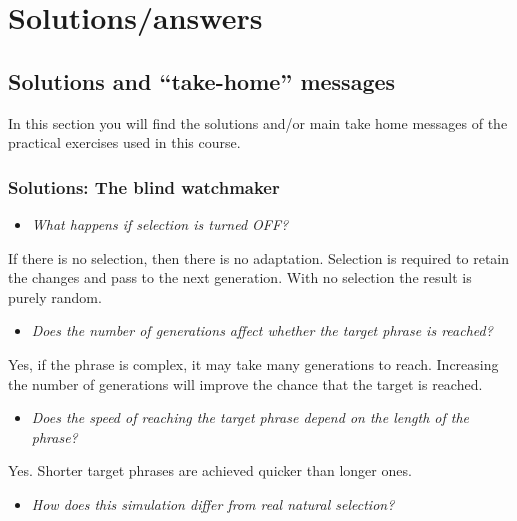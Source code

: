 \documentclass[
  a4paper]{book}
\providecommand{\tightlist}{%
  \setlength{\itemsep}{0pt}\setlength{\parskip}{0pt}}
\begin{document}
\part{Solutions/answers}\label{part-solutionsanswers}

\chapter{Solutions and ``take-home'' messages}\label{solutions-and-take-home-messages}

In this section you will find the solutions and/or main take home messages of the practical exercises used in this course.

\section{Solutions: The blind watchmaker}\label{solutions-the-blind-watchmaker}

\begin{itemize}
\tightlist
\item
  \emph{What happens if selection is turned OFF?}
\end{itemize}

If there is no selection, then there is no adaptation. Selection is required to retain the changes and pass to the next generation. With no selection the result is purely random.

\begin{itemize}
\tightlist
\item
  \emph{Does the number of generations affect whether the target phrase is reached?}
\end{itemize}

Yes, if the phrase is complex, it may take many generations to reach. Increasing the number of generations will improve the chance that the target is reached.

\begin{itemize}
\tightlist
\item
  \emph{Does the speed of reaching the target phrase depend on the length of the phrase?}
\end{itemize}

Yes. Shorter target phrases are achieved quicker than longer ones.

\begin{itemize}
\tightlist
\item
  \emph{How does this simulation differ from real natural selection?}
\end{itemize}
\end{document}

